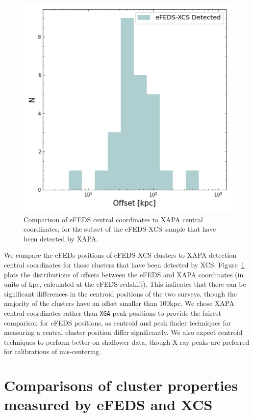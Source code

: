 \documentclass[fleqn,usenatbib]{mnras}
\begin{document}
\begin{figure}
    \centering
    \includegraphics[width=0.95\columnwidth]{images/eFEDS_XAPA_offset.png}
    \caption[]{Comparison of eFEDS central coordinates to XAPA central coordinates, for the subset of the eFEDS-XCS sample that have been detected by XAPA.}
    \label{fig:centcoords}
\end{figure}

We compare the eFEDs positions of eFEDS-XCS clusters to XAPA detection central coordinates for those clusters that have been detected by XCS.  Figure~\ref{fig:centcoords} plots the distributions of offsets between the eFEDS and XAPA coordinates (in units of kpc, calculated at the eFEDS redshift).  This indicates that there can be significant differences in the centroid positions of the two surveys, though the majority of the clusters have an offset smaller than 100kpc. We chose XAPA central coordinates rather than \texttt{XGA} peak positions to provide the fairest comparison for eFEDS positions, as centroid and peak finder techniques for measuring a central cluster position differ significantly.  We also expect centroid techniques to perform better on shallower data, though X-ray peaks are preferred for calibrations of mis-centering. 

\section{Comparisons of cluster properties measured by \lowercase{e}FEDS and XCS}
\label{sec:meascomp}
\end{document}
